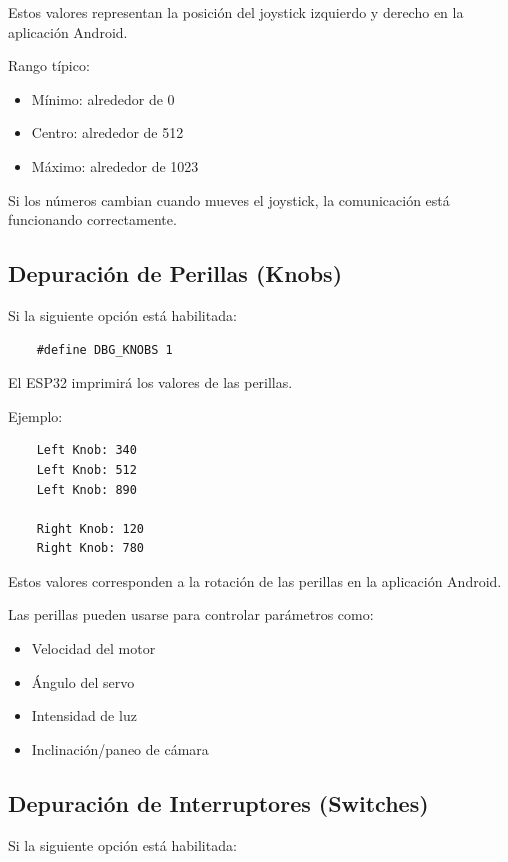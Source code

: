 Estos valores representan la posición del joystick izquierdo y derecho en la aplicación Android.

Rango típico:

\begin{itemize}
    \item Mínimo: alrededor de 0
    \item Centro: alrededor de 512
    \item Máximo: alrededor de 1023
\end{itemize}

Si los números cambian cuando mueves el joystick, la comunicación está funcionando correctamente.

\subsection{Depuración de Perillas (Knobs)}

Si la siguiente opción está habilitada:

\begin{verbatim}
    #define DBG_KNOBS 1
\end{verbatim}

El ESP32 imprimirá los valores de las perillas.

Ejemplo:

\begin{verbatim}
    Left Knob: 340
    Left Knob: 512
    Left Knob: 890

    Right Knob: 120
    Right Knob: 780
\end{verbatim}

Estos valores corresponden a la rotación de las perillas en la aplicación Android.

Las perillas pueden usarse para controlar parámetros como:

\begin{itemize}
    \item Velocidad del motor
    \item Ángulo del servo
    \item Intensidad de luz
    \item Inclinación/paneo de cámara
\end{itemize}

\subsection{Depuración de Interruptores (Switches)}

Si la siguiente opción está habilitada:

